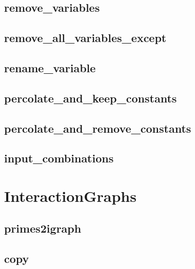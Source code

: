 \documentclass[letterpaper,10pt,english]{sphinxmanual}
\begin{document}
\subsection{remove\_variables}
\label{PrimeImplicants:remove-variables}\label{PrimeImplicants:id11}

\subsection{remove\_all\_variables\_except}
\label{PrimeImplicants:id12}\label{PrimeImplicants:remove-all-variables-except}

\subsection{rename\_variable}
\label{PrimeImplicants:rename-variable}\label{PrimeImplicants:id13}

\subsection{percolate\_and\_keep\_constants}
\label{PrimeImplicants:percolate-and-keep-constants}\label{PrimeImplicants:id14}

\subsection{percolate\_and\_remove\_constants}
\label{PrimeImplicants:percolate-and-remove-constants}\label{PrimeImplicants:id15}

\subsection{input\_combinations}
\label{PrimeImplicants:input-combinations}\label{PrimeImplicants:id16}

\section{InteractionGraphs}
\label{InteractionGraphs::doc}\label{InteractionGraphs:interactiongraphs}\label{InteractionGraphs:id1}

\subsection{primes2igraph}
\label{InteractionGraphs:id2}\label{InteractionGraphs:primes2igraph}

\subsection{copy}
\label{InteractionGraphs:igraph-copy}\label{InteractionGraphs:copy}
\end{document}

